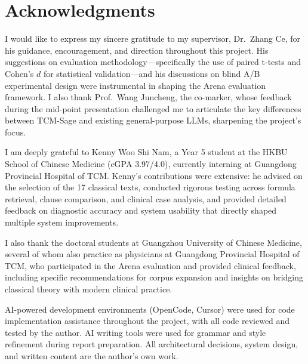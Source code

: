 \documentclass[11pt,a4paper]{report}
\begin{document}













\chapter*{Acknowledgments}

I would like to express my sincere gratitude to my supervisor, Dr.\ Zhang Ce, for his guidance, encouragement, and direction throughout this project. His suggestions on evaluation methodology---specifically the use of paired t-tests and Cohen's $d$ for statistical validation---and his discussions on blind A/B experimental design were instrumental in shaping the Arena evaluation framework. I also thank Prof.\ Wang Juncheng, the co-marker, whose feedback during the mid-point presentation challenged me to articulate the key differences between TCM-Sage and existing general-purpose LLMs, sharpening the project's focus.

I am deeply grateful to Kenny Woo Shi Nam, a Year 5 student at the HKBU School of Chinese Medicine (cGPA 3.97/4.0), currently interning at Guangdong Provincial Hospital of TCM. Kenny's contributions were extensive: he advised on the selection of the 17 classical texts, conducted rigorous testing across formula retrieval, clause comparison, and clinical case analysis, and provided detailed feedback on diagnostic accuracy and system usability that directly shaped multiple system improvements.

I also thank the doctoral students at Guangzhou University of Chinese Medicine, several of whom also practice as physicians at Guangdong Provincial Hospital of TCM, who participated in the Arena evaluation and provided clinical feedback, including specific recommendations for corpus expansion and insights on bridging classical theory with modern clinical practice.

AI-powered development environments (OpenCode, Cursor) were used for code implementation assistance throughout the project, with all code reviewed and tested by the author. AI writing tools were used for grammar and style refinement during report preparation. All architectural decisions, system design, and written content are the author's own work.
\end{document}
